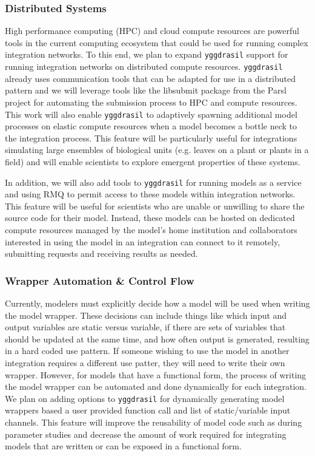 \documentclass[journal]{IEEEtran}
\newcommand{\pkg}{{\tt yggdrasil}{}}
\begin{document}
\subsubsection{Distributed Systems}\label{SS:distributed}
%
High performance computing (HPC) and cloud compute resources are powerful tools in the current computing ecosystem that could be used for running complex integration networks. To this end, we plan to expand {\pkg} support for running integration networks on distributed compute resources. {\pkg} already uses communication tools that can be adapted for use in a distributed pattern \citep[ZMQ, RMQ][]{ZMQ, RMQ} and we will leverage tools like the libsubmit package from the Parsl project \citep{babuji18} for automating the submission process to HPC and compute resources. This work will also enable {\pkg} to adaptively spawning additional model processes on elastic compute resources when a model becomes a bottle neck to the integration process. This feature will be particularly useful for integrations simulating large ensembles of biological units (e.g. leaves on a plant or plants in a field) and will enable scientists to explore emergent properties of these systems.

In addition, we will also add tools to {\pkg} for running models as a service and using RMQ to permit access to these models within integration networks. This feature will be useful for scientists who are unable or unwilling to share the source code for their model. Instead, these models can be hosted on dedicated compute resources managed by the model's home institution and collaborators interested in using the model in an integration can connect to it remotely, submitting requests and receiving results as needed.

\subsubsection{Wrapper Automation \& Control Flow}\label{SS:control}
%
Currently, modelers must explicitly decide how a model will be used when writing the model wrapper. These decisions can include things like which input and output variables are static versus variable, if there are sets of variables that should be updated at the same time, and how often output is generated, resulting in a hard coded use pattern. If someone wishing to use the model in another integration requires a different use patter, they will need to write their own wrapper. However, for models that have a functional form, the process of writing the model wrapper can be automated and done dynamically for each integration. We plan on adding options to {\pkg} for dynamically generating model wrappers based a user provided function call and list of static/variable input channels. This feature will improve the reusability of model code such as during parameter studies and decrease the amount of work required for integrating models that are written or can be exposed in a functional form. 
\end{document}
